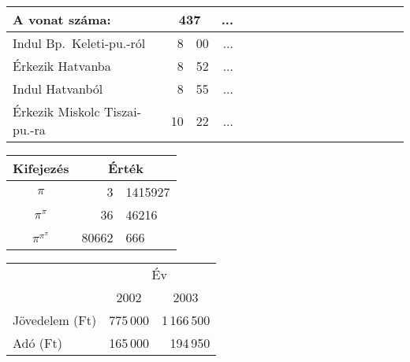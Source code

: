 \documentclass[a4paper]{article}
\begin{document}
\begin{tabular}{l||*8{r@{:}l|}}
A vonat száma: & \multicolumn{2}{c|}{437} & ...
\\
\hline\hline
Indul Bp.\ Keleti-pu.-ról & 8&00 & ... \\
Érkezik Hatvanba & 8&52 & ... \\
Indul Hatvanból & 8&55 & ... \\
Érkezik Miskolc Tiszai-pu.-ra & 10&22 & ... \\
\hline
\end{tabular}

\begin{tabular}{c|r@{,}l}
Kifejezés & \multicolumn{2}{c}{Érték} \\
\hline
$\pi$ & 3&1415927 \\
$\pi^\pi$ & 36&46216 \\
$\pi^{\pi^\pi}$ & 80662&666
\end{tabular}

\begin{tabular}{@{}lrr@{}}
\toprule
&\multicolumn{2}{c}{Év}\\
\cmidrule{2-3}
& \multicolumn{1}{c}{2002} &
\multicolumn{1}{c}{2003}\\
\midrule
Jövedelem (Ft)& 775\,000 & 1\,166\,500\\
Adó (Ft) & 165\,000 & 194\,950\\
\bottomrule
\end{tabular}
\end{document}
